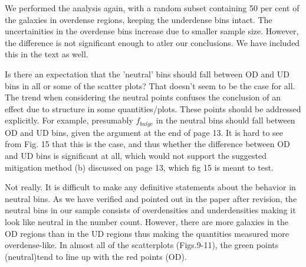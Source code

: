 \documentclass[english]{letter}
\begin{document}
We performed the analysis again, with a random subset containing 50 per cent of the galaxies in overdense regions, keeping the underdense bins intact. The uncertainities in the overdense bins increase due to smaller sample size. However, the difference is not significant enough to atler our conclusions. We have included this in the text as well.

\begin{shaded}
Is there an expectation that the 'neutral' bins should fall between OD and UD bins in all or some of the scatter plots? That doesn't seem to be the case for all. The trend when considering the neutral points confuses the conclusion of an effect due to structure in some quantities/plots. These points should be addressed explicitly. For example, presumably $f_{bulge}$ in the neutral bins should fall between OD and UD bins, given the argument at the end of page 13. It is hard to see from Fig. 15 that this is the case, and thus whether the difference between OD and UD bins is significant at all, which would not support the suggested mitigation method (b) discussed on page 13, which fig 15 is meant to test.
\end{shaded}

Not really. It is difficult to make any definitive statements about the behavior in neutral bins. As we have verified and pointed out in the paper after revision,
the neutral bins in our sample consists of overdensities and underdensities making it look like neutral in the number count. However, there are more galaxies in the OD regions than in the UD regions thus making the quantities measured more overdense-like. In almost all of the scatterplots (Figs.9-11), the green points (neutral)tend to line up with the red points (OD). 
\end{document}
